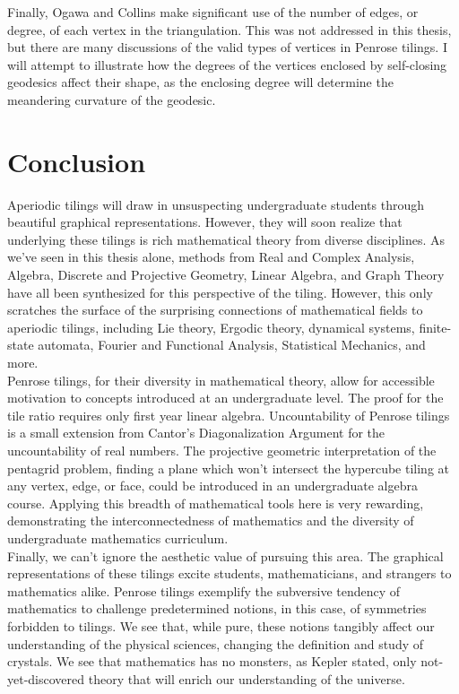 \documentclass[
  oneside,
  11pt, a4paper,
  footinclude=true,
  headinclude=true,
  cleardoublepage=empty
]{scrbook}
\begin{document}
Finally, Ogawa and Collins make significant use of the number of edges, or degree, of each vertex in the triangulation. This was not addressed in this thesis, but there are many discussions of the valid types of vertices in Penrose tilings. I will attempt to illustrate how the degrees of the vertices enclosed by self-closing geodesics affect their shape, as the enclosing degree will determine the meandering curvature of the geodesic. 

\chapter{Conclusion}
Aperiodic tilings will draw in unsuspecting undergraduate students through beautiful graphical representations.  However, they will soon realize that underlying these tilings is rich mathematical theory from diverse disciplines. As we've seen in this thesis alone, methods from Real and Complex Analysis, Algebra, Discrete and Projective Geometry, Linear Algebra, and Graph Theory have all been synthesized for this perspective of the tiling. However, this only scratches the surface of the surprising connections of mathematical fields to aperiodic tilings, including Lie theory, Ergodic theory, dynamical systems, finite-state automata, Fourier and Functional Analysis, Statistical Mechanics, and more.\\
Penrose tilings, for their diversity in mathematical theory, allow for accessible motivation to concepts introduced at an undergraduate level. The proof for the tile ratio requires only first year linear algebra. Uncountability of Penrose tilings is a small extension from Cantor's Diagonalization Argument for the uncountability of real numbers. The projective geometric interpretation of the pentagrid problem, finding a plane which won't intersect the hypercube tiling at any vertex, edge, or face, could be introduced in an undergraduate algebra course. Applying this breadth of mathematical tools here is very rewarding, demonstrating the interconnectedness of mathematics and the diversity of undergraduate mathematics curriculum.\\
Finally, we can't ignore the aesthetic value of pursuing this area. The graphical representations of these tilings excite students, mathematicians, and strangers to mathematics alike. Penrose tilings exemplify the subversive tendency of mathematics to challenge predetermined notions, in this case, of symmetries forbidden to tilings. We see that, while pure, these notions tangibly affect our understanding of the physical sciences, changing the definition and study of crystals. We see that mathematics has no monsters, as Kepler stated, only not-yet-discovered theory that will enrich our understanding of the universe. 





    


\end{document}
